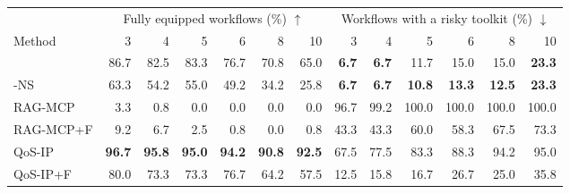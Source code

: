 \begin{tabular}{lrrrrrrrrrrrr}\toprule
& \multicolumn{6}{c}{Fully equipped workflows (\%) $\uparrow$} & \multicolumn{6}{c}{Workflows with a risky toolkit (\%) $\downarrow$} \\ \cmidrule(lr){2-7}\cmidrule(lr){8-13}
Method & 3 & 4 & 5 & 6 & 8 & 10 & 3 & 4 & 5 & 6 & 8 & 10 \\ \midrule
\sysname{} & 86.7 & 82.5 & 83.3 & 76.7 & 70.8 & 65.0 & \textbf{6.7} & \textbf{6.7} & 11.7 & 15.0 & 15.0 & \textbf{23.3} \\
\sysname{}-NS & 63.3 & 54.2 & 55.0 & 49.2 & 34.2 & 25.8 & \textbf{6.7} & \textbf{6.7} & \textbf{10.8} & \textbf{13.3} & \textbf{12.5} & \textbf{23.3} \\
RAG-MCP & 3.3 & 0.8 & 0.0 & 0.0 & 0.0 & 0.0 & 96.7 & 99.2 & 100.0 & 100.0 & 100.0 & 100.0 \\
RAG-MCP+F & 9.2 & 6.7 & 2.5 & 0.8 & 0.0 & 0.8 & 43.3 & 43.3 & 60.0 & 58.3 & 67.5 & 73.3 \\
QoS-IP & \textbf{96.7} & \textbf{95.8} & \textbf{95.0} & \textbf{94.2} & \textbf{90.8} & \textbf{92.5} & 67.5 & 77.5 & 83.3 & 88.3 & 94.2 & 95.0 \\
QoS-IP+F & 80.0 & 73.3 & 73.3 & 76.7 & 64.2 & 57.5 & 12.5 & 15.8 & 16.7 & 26.7 & 25.0 & 35.8 \\
\bottomrule\end{tabular}
